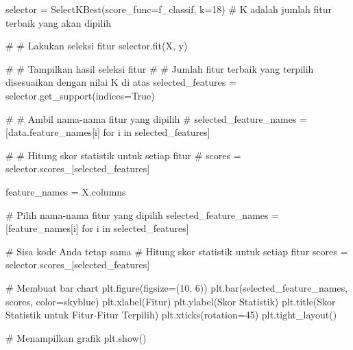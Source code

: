 \documentclass[
  letterpaper,
]{krantz}
\makeatletter
\newenvironment{Shaded}{\begin{snugshade}}{\end{snugshade}}
\newcommand{\CommentTok}[1]{\textcolor[rgb]{0.37,0.37,0.37}{#1}}
\newcommand{\ControlFlowTok}[1]{\textcolor[rgb]{0.00,0.23,0.31}{#1}}
\newcommand{\DecValTok}[1]{\textcolor[rgb]{0.68,0.00,0.00}{#1}}
\newcommand{\KeywordTok}[1]{\textcolor[rgb]{0.00,0.23,0.31}{#1}}
\newcommand{\NormalTok}[1]{\textcolor[rgb]{0.00,0.23,0.31}{#1}}
\newcommand{\OperatorTok}[1]{\textcolor[rgb]{0.37,0.37,0.37}{#1}}
\newcommand{\StringTok}[1]{\textcolor[rgb]{0.13,0.47,0.30}{#1}}
\newcommand{\VariableTok}[1]{\textcolor[rgb]{0.07,0.07,0.07}{#1}}
\newenvironment{kframe}{%
\medskip{}
\setlength{\fboxsep}{.8em}
 \def\at@end@of@kframe{}%
 \ifinner\ifhmode%
  \def\at@end@of@kframe{\end{minipage}}%
  \begin{minipage}{\columnwidth}%
 \fi\fi%
 \def\FrameCommand##1{\hskip\@totalleftmargin \hskip-\fboxsep
 \colorbox{shadecolor}{##1}\hskip-\fboxsep
     \hskip-\linewidth \hskip-\@totalleftmargin \hskip\columnwidth}%
 \MakeFramed {\advance\hsize-\width
   \@totalleftmargin\z@ \linewidth\hsize
   \@setminipage}}%
 {\par\unskip\endMakeFramed%
 \at@end@of@kframe}
\renewenvironment{Shaded}{\begin{kframe}}{\end{kframe}}
\makeatother
\begin{document}
\begin{Shaded}
\begin{Highlighting}[]
\NormalTok{selector }\OperatorTok{=}\NormalTok{ SelectKBest(score\_func}\OperatorTok{=}\NormalTok{f\_classif, k}\OperatorTok{=}\DecValTok{18}\NormalTok{)  }\CommentTok{\# K adalah jumlah fitur terbaik yang akan dipilih}

\CommentTok{\# \# Lakukan seleksi fitur}
\NormalTok{selector.fit(X, y)}

\CommentTok{\# \# Tampilkan hasil seleksi fitur}
\CommentTok{\# \# Jumlah fitur terbaik yang terpilih disesuaikan dengan nilai K di atas}
\NormalTok{selected\_features }\OperatorTok{=}\NormalTok{ selector.get\_support(indices}\OperatorTok{=}\VariableTok{True}\NormalTok{)}

\CommentTok{\# \# Ambil nama{-}nama fitur yang dipilih}
\CommentTok{\# selected\_feature\_names = [data.feature\_names[i] for i in selected\_features]}

\CommentTok{\# \# Hitung skor statistik untuk setiap fitur}
\CommentTok{\# scores = selector.scores\_[selected\_features]}

\NormalTok{feature\_names }\OperatorTok{=}\NormalTok{ X.columns}

\CommentTok{\# Pilih nama{-}nama fitur yang dipilih}
\NormalTok{selected\_feature\_names }\OperatorTok{=}\NormalTok{ [feature\_names[i] }\ControlFlowTok{for}\NormalTok{ i }\KeywordTok{in}\NormalTok{ selected\_features]}

\CommentTok{\# Sisa kode Anda tetap sama}
\CommentTok{\# Hitung skor statistik untuk setiap fitur}
\NormalTok{scores }\OperatorTok{=}\NormalTok{ selector.scores\_[selected\_features]}


\CommentTok{\# Membuat bar chart}
\NormalTok{plt.figure(figsize}\OperatorTok{=}\NormalTok{(}\DecValTok{10}\NormalTok{, }\DecValTok{6}\NormalTok{))}
\NormalTok{plt.bar(selected\_feature\_names, scores, color}\OperatorTok{=}\StringTok{\textquotesingle{}skyblue\textquotesingle{}}\NormalTok{)}
\NormalTok{plt.xlabel(}\StringTok{\textquotesingle{}Fitur\textquotesingle{}}\NormalTok{)}
\NormalTok{plt.ylabel(}\StringTok{\textquotesingle{}Skor Statistik\textquotesingle{}}\NormalTok{)}
\NormalTok{plt.title(}\StringTok{\textquotesingle{}Skor Statistik untuk Fitur{-}Fitur Terpilih\textquotesingle{}}\NormalTok{)}
\NormalTok{plt.xticks(rotation}\OperatorTok{=}\DecValTok{45}\NormalTok{)}
\NormalTok{plt.tight\_layout()}

\CommentTok{\# Menampilkan grafik}
\NormalTok{plt.show()}
\end{Highlighting}
\end{Shaded}
\end{document}
